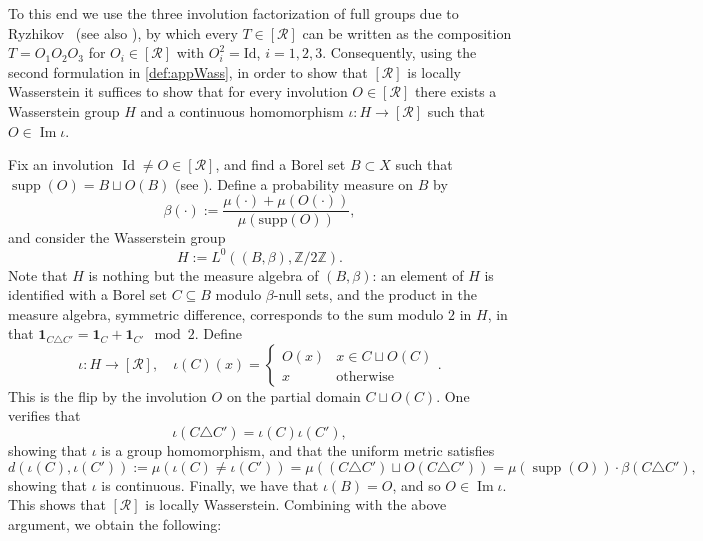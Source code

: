\documentclass{amsart}
\numberwithin{equation}{subsection}
\theoremstyle{plain}
\theoremstyle{definition}
\theoremstyle{plain}
\begin{document}
\smallskip

To this end we use the three involution factorization of full groups due to Ryzhikov~\cite[p.~823]{ryzhikov1993factorization} (see also \cite[Prop.~2.6,\,Thm.~5.8]{miller2004full}), by which every \(T\in\left[\mathcal{R}\right]\) can be written as the composition \(T=O_{1}O_{2}O_{3}\) for \(O_{i}\in\left[\mathcal{R}\right]\) with \(O_{i}^{2}=\mathrm{Id}\), \(i=1,2,3\). Consequently, using the second formulation in \cref{def:appWass}, in order to show that \(\left[\mathcal{R}\right]\) is locally Wasserstein it suffices to show that for every involution \(O\in\left[\mathcal{R}\right]\) there exists a Wasserstein group \(H\) and a continuous homomorphism \(\iota:H\to\left[\mathcal{R}\right]\) such that \(O\in\operatorname{Im}\iota\).

\smallskip

Fix an involution \(\operatorname{Id}\neq O\in\left[\mathcal{R}\right]\), and find a Borel set \(B\subset X\) such that \(\operatorname{supp}\left(O\right)=B\sqcup O\left(B\right)\) (see \cite[Lem.~2.12]{hoareau2025polish}). Define a probability measure on \(B\) by
\[\beta\left(\cdot\right):=\frac{\mu\left(\cdot\right)+\mu\left(O\left(\cdot\right)\right)}{\mu\left(\mathrm{supp}\left(O\right)\right)},\]
and consider the Wasserstein group
\[H:=L^{0}\left(\left(B,\beta\right),\mathbb{Z}/2\mathbb{Z}\right).\]
Note that \(H\) is nothing but the measure algebra of \(\left(B,\beta\right)\): an element of \(H\) is identified with a Borel set \(C\subseteq B\) modulo \(\beta\)-null sets, and the product in the measure algebra, symmetric difference, corresponds to the sum modulo \(2\) in \(H\), in that \(\mathbf{1}_{C\triangle C'}=\mathbf{1}_{C}+\mathbf{1}_{C'}\mod 2\). Define
\[\iota:H\to\left[\mathcal{R}\right],\quad\iota\left(C\right)\left(x\right)=\begin{cases}
O\left(x\right) & x\in C\sqcup O\left(C\right)\\
x & \text{otherwise}
\end{cases}.\]
This is the flip by the involution \(O\) on the partial domain \(C\sqcup O\left(C\right)\). One verifies that
\[\iota\left(C\triangle C'\right)=\iota\left(C\right)\iota\left(C'\right),\]
showing that \(\iota\) is a group homomorphism, and that the uniform metric satisfies
\[d\left(\iota\left(C\right),\iota\left(C'\right)\right):=\mu\left(\iota\left(C\right)\neq\iota\left(C'\right)\right)=\mu\left(\left(C\triangle C'\right)\sqcup O\left(C\triangle C'\right)\right)=\mu\left(\operatorname{supp}\left(O\right)\right)\cdot\beta\left(C\triangle C'\right),\]
showing that \(\iota\) is continuous. Finally, we have that \(\iota\left(B\right)=O\), and so \(O\in\operatorname{Im}\iota\). This shows that \(\left[\mathcal{R}\right]\) is locally Wasserstein. Combining \cite[Thm.~5.7]{giordano2007some} with the above argument, we obtain the following:
\end{document}
